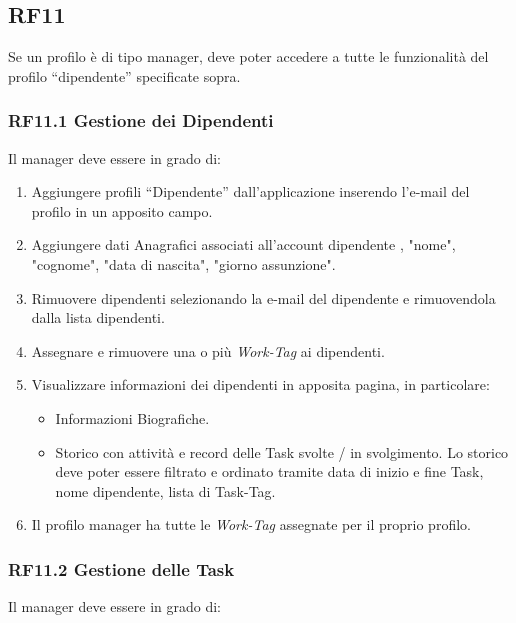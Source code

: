 \documentclass{report}
\begin{document}
\subsection*{RF11}
Se un profilo è di tipo manager, deve poter accedere a tutte le funzionalità del profilo “dipendente” specificate sopra.

\subsubsection*{RF11.1 Gestione dei Dipendenti}
Il manager deve essere in grado di:

\begin{enumerate}
	
	\item Aggiungere profili “Dipendente” dall’applicazione inserendo l’e-mail del profilo in un apposito campo.
	\item Aggiungere dati Anagrafici associati all'account dipendente , "nome", "cognome", "data di nascita", "giorno assunzione".
	\item Rimuovere dipendenti selezionando la e-mail del dipendente e rimuovendola dalla lista dipendenti.
	
	\item Assegnare e rimuovere una o più \textit{Work-Tag} ai dipendenti. 
	
	\item Visualizzare informazioni dei dipendenti in apposita pagina, in particolare:
	
	\begin{itemize}
		\item Informazioni Biografiche.
		\item Storico con attività e record delle Task svolte / in svolgimento. Lo storico deve poter essere filtrato e ordinato tramite data di inizio e fine Task, nome dipendente, lista di Task-Tag.
		
	\end{itemize}
	
	\item Il profilo manager ha tutte le \textit{Work-Tag} assegnate per il proprio profilo.
		
\end{enumerate}

\subsubsection{RF11.2 Gestione delle Task}
Il manager deve essere in grado di:
\end{document}
